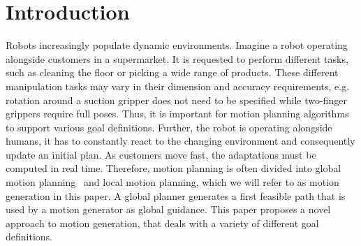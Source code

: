 \section{Introduction}%
\label{sec:introduction}

Robots increasingly populate dynamic environments. 
Imagine a robot
operating alongside customers in a supermarket. It is requested to perform different
tasks, such as cleaning the floor or picking a wide range of products.
These different manipulation tasks may vary in their dimension
and accuracy requirements, e.g. rotation around a suction gripper
does not need to be specified while two-finger grippers require full poses. Thus,
it is important for motion planning algorithms to support various goal definitions.
Further, the robot is operating alongside humans, it has to constantly react to
the changing environment and consequently update an initial plan.
As customers move fast, the adaptations must be
computed in real time.
Therefore, motion planning is often divided into global motion
planning~\cite{Karaman2011} and local motion planning, which we will refer
to as motion generation in this paper. A global planner
generates a first feasible path that is used by a motion generator as global guidance.
This paper proposes a novel approach to motion generation, that deals
with a variety of different goal definitions. 

